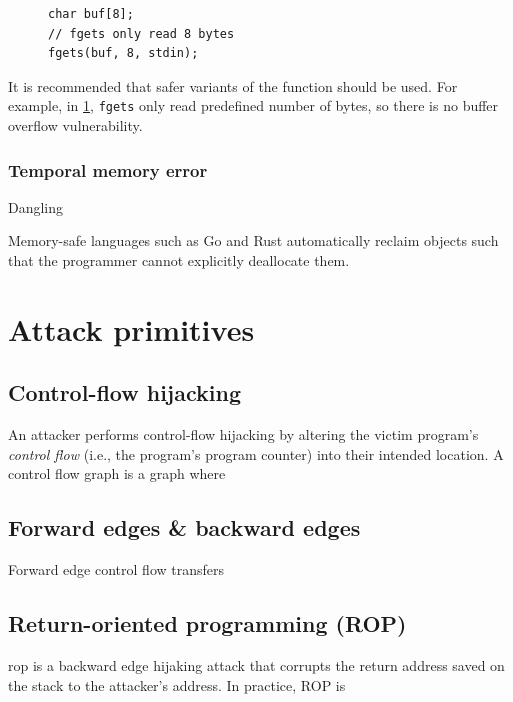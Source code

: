 \documentclass[11pt]{memoir}
\begin{document}
\begin{figure}
\begin{verbatim}
char buf[8];
// fgets only read 8 bytes
fgets(buf, 8, stdin); 
\end{verbatim}
\label{lst:fgets}
\end{figure}

It is recommended that safer variants of the function should be used. 
For example, in \cref{lst:fgets}, \texttt{fgets} only read predefined number of
bytes, so there is no buffer overflow vulnerability.










%
\subsubsection{Temporal memory error}
Dangling

Memory-safe languages such as Go and Rust automatically reclaim objects such that the programmer cannot explicitly deallocate them.





\section{Attack primitives}

\subsection{Control-flow hijacking}
An attacker performs control-flow hijacking by altering the victim program's \emph{control flow} (i.e., the program's program counter) into their intended location. 
A control flow graph is a graph where

\subsection{Forward edges \& backward edges}

Forward edge control flow transfers

\subsection{Return-oriented programming (ROP)}
\gls{rop} is a backward edge hijaking attack that corrupts the return address saved on the stack to the attacker's address.
In practice, ROP is
\end{document}
